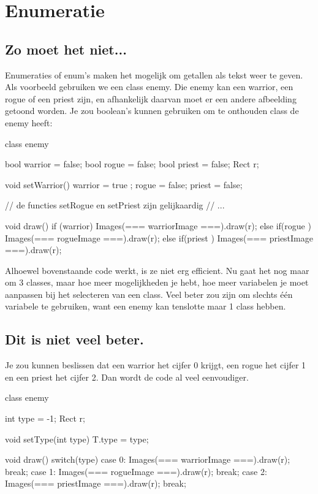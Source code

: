 \chapter{Enumeratie}
\section{Zo moet het niet...}
Enumeraties of enum's maken het mogelijk om getallen als tekst weer te geven. Als voorbeeld gebruiken we een class enemy. Die enemy kan een warrior, een rogue of een priest zijn, en afhankelijk daarvan moet er een andere afbeelding getoond worden. Je zou boolean's kunnen gebruiken om te onthouden class de enemy heeft:

\begin{code}
class enemy {
  bool warrior = false;
	bool rogue   = false;
	bool priest  = false;
	Rect r;
	
	void setWarrior() {
		warrior = true ;
		rogue   = false;
		priest  = false;
	}
	
	// de functies setRogue en setPriest zijn gelijkaardig
	// ...
	
	void draw() {
	  if     (warrior) Images(=== warriorImage ===).draw(r);
		else if(rogue  ) Images(=== rogueImage   ===).draw(r);
		else if(priest ) Images(=== priestImage  ===).draw(r);
	}
}
\end{code}

Alhoewel bovenstaande code werkt, is ze niet erg efficient. Nu gaat het nog maar om 3 classes, maar hoe meer mogelijkheden je hebt, hoe meer variabelen je moet aanpassen bij het selecteren van een class. Veel beter zou zijn om slechts \'e\'en variabele te gebruiken, want een enemy kan tenslotte maar 1 class hebben.

\section{Dit is niet veel beter.}
Je zou kunnen beslissen dat een warrior het cijfer 0 krijgt, een rogue het cijfer 1 en een priest het cijfer 2. Dan wordt de code al veel eenvoudiger.

\begin{code}
class enemy {
  int type = -1;
	Rect r;
	
	void setType(int type) {
		T.type = type;
	}
	
	void draw() {
		switch(type) {
			case 0: Images(=== warriorImage ===).draw(r); break;
			case 1: Images(=== rogueImage   ===).draw(r); break;
			case 2: Images(=== priestImage  ===).draw(r); break;
	  }
	}
}
\end{code}


